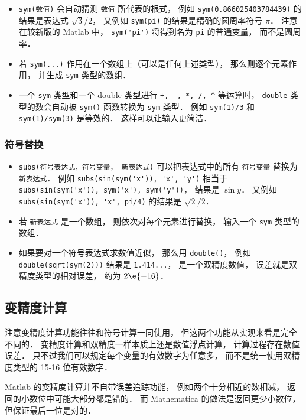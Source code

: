 \begin{itemize}
\item  \verb|sym(数值)| 会自动猜测 \verb|数值| 所代表的根式， 例如 \verb|sym(0.866025403784439)| 的结果是表达式 $\sqrt{3}/2$， 又例如 \verb|sym(pi)| 的结果是精确的圆周率符号 $\pi$． 注意在较新版的 Matlab 中， \verb|sym('pi')| 将得到名为 \verb|pi| 的普通变量， 而不是圆周率．

\item 若 \verb|sym(...)| 作用在一个数组上（可以是任何上述类型）， 那么则逐个元素作用， 并生成 \verb|sym| 类型的数组．

\item 一个 \verb|sym| 类型和一个 double 类型进行 \verb|+, -, *, /, ^| 等运算时， \verb|double| 类型的数会自动被 \verb|sym()| 函数转换为 \verb|sym| 类型． 例如 \verb|sym(1)/3| 和 \verb|sym(1)/sym(3)| 是等效的． 这样可以让输入更简洁．
\end{itemize}

\subsubsection{符号替换}
\begin{itemize}
\item \verb|subs(符号表达式，符号变量， 新表达式)| 可以把表达式中的所有 \verb|符号变量| 替换为 \verb|新表达式|． 例如 \verb|subs(sin(sym('x')), 'x', 'y')| 相当于 \verb|subs(sin(sym('x')), sym('x'), sym('y'))|， 结果是 $\sin y$． 又例如 \verb|subs(sin(sym('x')), 'x', pi/4)| 的结果是 $\sqrt 2/2$．
\item 若 \verb|新表达式| 是一个数组， 则依次对每个元素进行替换， 输入一个 \verb|sym| 类型的数组．
\item 如果要对一个符号表达式求数值近似， 那么用 \verb|double()|， 例如 \verb|double(sqrt(sym(2)))| 结果是 \verb|1.414...|， 是一个双精度数值， 误差就是双精度类型的相对误差， 约为 $2\e{-16}$．
\end{itemize}

\subsection{变精度计算}
注意变精度计算功能往往和符号计算一同使用， 但这两个功能从实现来看是完全不同的． 变精度计算和双精度一样本质上还是数值浮点计算， 计算过程存在数值误差． 只不过我们可以规定每个变量的有效数字为任意多， 而不是统一使用双精度类型的 15-16 位有效数字．

Matlab 的变精度计算并不自带误差追踪功能， 例如两个十分相近的数相减， 返回的小数位中可能大部分都是错的． 而 Mathematica 的做法是返回更少小数位， 但保证最后一位是对的．


